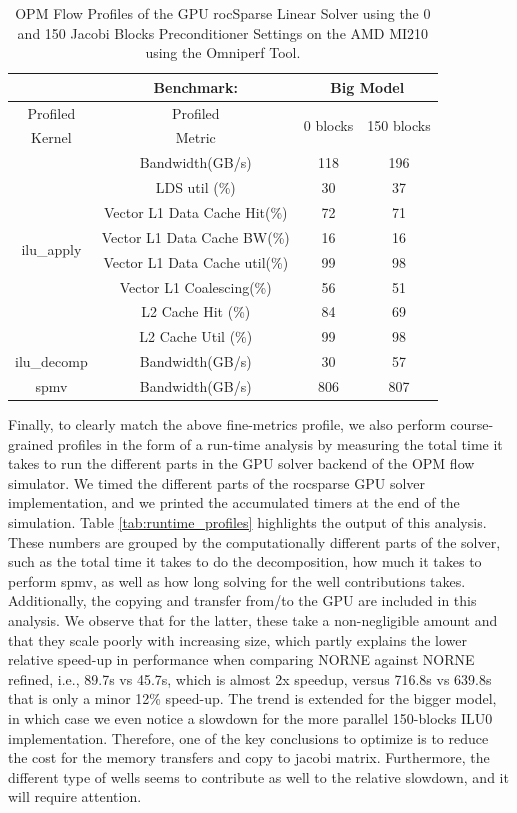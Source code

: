 \begin{table}[!h]
\centering
\begin{tabular}{c|c|c|c}
& Benchmark: & \multicolumn{2}{|c}{Big Model} \\\hline
Profiled & Profiled & \multirow{2}{*}{0 blocks} & \multirow{2}{*}{150 blocks} \\ 
Kernel & Metric & & \\\hline\hline
\multirow{8}{*}{ilu\_apply} & Bandwidth(GB/s) & 118 & 196 \\
 & LDS util (\%) & 30 & 37 \\
 & Vector L1 Data Cache Hit(\%) & 72 & 71\\
 & Vector L1 Data Cache BW(\%) & 16 & 16\\
 & Vector L1 Data Cache util(\%) & 99 & 98\\
 & Vector L1 Coalescing(\%) & 56 & 51\\
 & L2 Cache Hit (\%) & 84 & 69\\
 & L2 Cache Util (\%) & 99 & 98 \\\hline
\multirow{1}{*}{ilu\_decomp} & Bandwidth(GB/s) & 30 & 57 \\\hline
\multirow{1}{*}{spmv} & Bandwidth(GB/s) & 806 & 807 \\
\end{tabular}
\caption{OPM Flow Profiles of the GPU rocSparse Linear Solver using the 0 and 150 Jacobi Blocks Preconditioner Settings on the AMD MI210 using the Omniperf Tool.}
\label{tab:omniperf}
\end{table}

Finally, to clearly match the above fine-metrics profile, we also perform course-grained profiles in the form of a run-time analysis by measuring the total time it takes to run the different parts in the GPU solver backend of the OPM flow simulator. We timed the different parts of the rocsparse GPU solver implementation, and we printed the accumulated timers at the end of the simulation. Table \ref{tab:runtime_profiles} highlights the output of this analysis. These numbers are grouped by the computationally different parts of the solver, such as the total time it takes to do the decomposition, how much it takes to perform spmv, as well as how long solving for the well contributions takes. Additionally, the copying and transfer from/to the GPU are included in this analysis. We observe that for the latter, these take a non-negligible amount and that they scale poorly with increasing size, which partly explains the lower relative speed-up in performance when comparing NORNE against NORNE refined, i.e., 89.7s vs 45.7s, which is almost 2x speedup, versus 716.8s vs 639.8s that is only a minor 12\% speed-up. The trend is extended for the bigger model, in which case we even notice a slowdown for the more parallel 150-blocks ILU0 implementation. Therefore, one of the key conclusions to optimize is to reduce the cost for the memory transfers and copy to jacobi matrix. Furthermore, the different type of wells seems to contribute as well to the relative slowdown, and it will require attention. 

